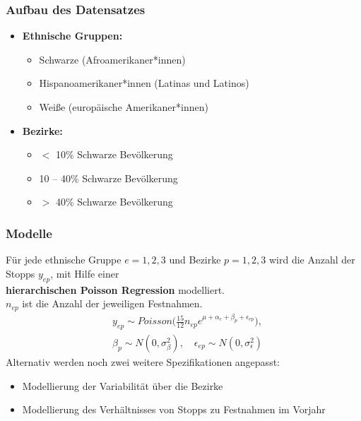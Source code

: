 \documentclass{beamer}
\begin{document}
	\begin{frame}
		\frametitle{Aufbau des Datensatzes}
		\begin{itemize}
			\item[\textbullet] \textbf{Ethnische Gruppen:}
			\begin{itemize}
				\item[\textbullet] Schwarze (Afroamerikaner*innen)
				\item[\textbullet] Hispanoamerikaner*innen (Latinas und Latinos)
				\item[\textbullet] Weiße (europäische Amerikaner*innen)
			\end{itemize}
		\end{itemize}
		\begin{itemize}
			\item[\textbullet] \textbf{Bezirke:}
			\begin{itemize}
				\item[\textbullet] $<$ 10\% Schwarze Bevölkerung
				\item[\textbullet] 10 – 40\% Schwarze Bevölkerung
				\item[\textbullet] $>$ 40\% Schwarze Bevölkerung
			\end{itemize}
		\end{itemize}
	\end{frame}
	\begin{frame}
		\frametitle{Modelle}
		Für jede ethnische Gruppe $ e=1, 2, 3$ und Bezirke $p=1, 2, 3$ wird die Anzahl der Stopps $y_{ep}$, mit Hilfe einer \\ \textbf{hierarchischen Poisson Regression} modelliert. \\
		$n_{ep}$ ist die Anzahl der jeweiligen Festnahmen.
		\newline
		\begin{align}& y_{ep} \sim Poisson \biggl(\frac{15}{12}n_{ep}e^{\mu+\alpha_e+\beta_p+\epsilon_{ep}}\biggl), \nonumber \\
			& \beta_p \sim N(0, \sigma_\beta^2), \quad
			\epsilon_{ep} \sim N(0, \sigma_\epsilon^2)  \nonumber
		\end{align}
		\newline
		Alternativ werden noch zwei weitere Spezifikationen angepasst:\\
		\begin{itemize}
			\item[\textbullet] Modellierung der Variabilität über die Bezirke
			\item[\textbullet] Modellierung des Verhältnisses von Stopps zu Festnahmen im Vorjahr
		\end{itemize}
	\end{frame}
\end{document}
